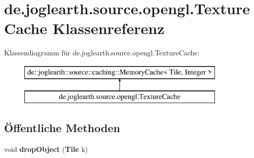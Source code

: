 \section{de.\-joglearth.\-source.\-opengl.\-Texture\-Cache Klassenreferenz}
\label{classde_1_1joglearth_1_1source_1_1opengl_1_1_texture_cache}
Klassendiagramm für de.\-joglearth.\-source.\-opengl.\-Texture\-Cache\-:\begin{figure}[H]
\begin{center}
\leavevmode
\includegraphics[height=2.000000cm]{classde_1_1joglearth_1_1source_1_1opengl_1_1_texture_cache}
\end{center}
\end{figure}
\subsection*{Öffentliche Methoden}
\begin{DoxyCompactItemize}
\item 
void {\bfseries drop\-Object} ({\bf Tile} k)\label{classde_1_1joglearth_1_1source_1_1opengl_1_1_texture_cache_af78af343a17ade633613f278d1e16c26}

\end{DoxyCompactItemize}
